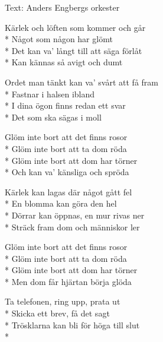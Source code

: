 \begin{SongText}
    \begin{SongInfo}
        Text:  Anders Engbergs orkester
    \end{SongInfo}
    \begin{SongVerse}
        Kärlek och löften som kommer och går\\*%
        Något som någon har glömt\\*%
        Det kan va’ långt till att säga förlåt\\*%
        Kan kännas så avigt och dumt
    \end{SongVerse}
    \begin{SongVerse}
        Ordet man tänkt kan va’ svårt att få fram\\*%
        Fastnar i halsen ibland\\*%
        I dina ögon finns redan ett svar\\*%
        Det som ska sägas i moll
    \end{SongVerse}
    \begin{SongVerse}
        Glöm inte bort att det finns rosor\\*%
        Glöm inte bort att ta dom röda\\*%
        Glöm inte bort att dom har törner\\*%
        Och kan va’ känsliga och spröda
    \end{SongVerse}
    \begin{SongVerse}
        Kärlek kan lagas där något gått fel\\*%
        En blomma kan göra den hel\\*%
        Dörrar kan öppnas, en mur rivas ner\\*%
        Sträck fram dom och människor ler
    \end{SongVerse}
    \begin{SongVerse}
        Glöm inte bort att det finns rosor\\*%
        Glöm inte bort att ta dom röda\\*%
        Glöm inte bort att dom har törner\\*%
        Men dom får hjärtan börja glöda
    \end{SongVerse}
    \begin{SongVerse}
        Ta telefonen, ring upp, prata ut\\*%
        Skicka ett brev, få det sagt\\*%
        Trösklarna kan bli för höga till slut\\*%

\end{SongVerse}
\end{SongText}

